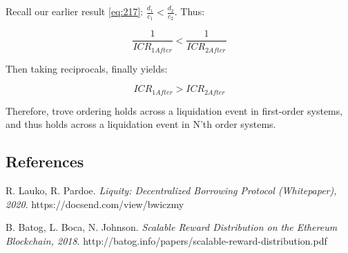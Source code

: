 \documentclass[reqno]{article}
\begin{document}
\bigskip
Recall our earlier result \ref{eq:217}: $\frac{d_1}{c_1}<\frac{d_2}{c_2}$. Thus:

\begin{equation} 
    \frac{1}{ICR_{1After}}<\frac{1}{ICR_{2After}}
\end{equation}

\bigskip
Then taking reciprocals, finally yields:

\begin{equation} 
    ICR_{1After}>ICR_{2After}
\end{equation}

\bigskip
Therefore, trove ordering holds across a liquidation event in first-order systems, and thus holds across a liquidation event in N’th order systems.

\bigskip
\subsection*{References}

\begin{thebibliography}{9}

R. Lauko, R. Pardoe. 
\textit{Liquity: Decentralized Borrowing Protocol (Whitepaper), 2020}. 
https://docsend.com/view/bwiczmy

B. Batog, L. Boca, N. Johnson.
\textit{Scalable Reward Distribution on the Ethereum Blockchain, 2018}. 
http://batog.info/papers/scalable-reward-distribution.pdf


\end{thebibliography}
\end{document}
